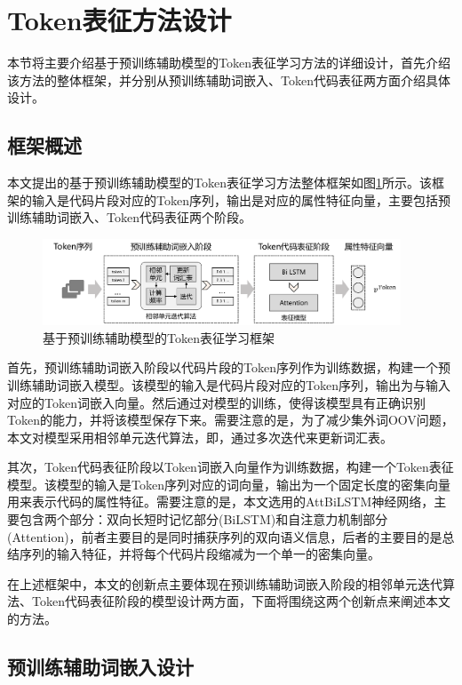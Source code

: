 \section{Token表征方法设计}
\label{sec:Token}
本节将主要介绍基于预训练辅助模型的Token表征学习方法的详细设计，首先介绍该方法的整体框架，并分别从预训练辅助词嵌入、Token代码表征两方面介绍具体设计。

\subsection{框架概述}
\label{subsec:TokenOverview}
本文提出的基于预训练辅助模型的Token表征学习方法整体框架如图\ref{fig:tokenframework}所示。该框架的输入是代码片段对应的Token序列，输出是对应的属性特征向量，主要包括预训练辅助词嵌入、Token代码表征两个阶段。

\begin{figure}[H]
  \centering
  \includegraphics[width=0.95\textwidth]{figures/tokenframework}
  \caption{基于预训练辅助模型的Token表征学习框架}\label{fig:tokenframework}
\end{figure}

首先，预训练辅助词嵌入阶段以代码片段的Token序列作为训练数据，构建一个预训练辅助词嵌入模型。该模型的输入是代码片段对应的Token序列，输出为与输入对应的Token词嵌入向量。然后通过对模型的训练，使得该模型具有正确识别Token的能力，并将该模型保存下来。需要注意的是，为了减少集外词OOV问题，本文对模型采用相邻单元迭代算法，即，通过多次迭代来更新词汇表。

其次，Token代码表征阶段以Token词嵌入向量作为训练数据，构建一个Token表征模型。该模型的输入是Token序列对应的词向量，输出为一个固定长度的密集向量用来表示代码的属性特征。需要注意的是，本文选用的AttBiLSTM神经网络，主要包含两个部分：双向长短时记忆部分(BiLSTM)和自注意力机制部分(Attention)，前者主要目的是同时捕获序列的双向语义信息，后者的主要目的是总结序列的输入特征，并将每个代码片段缩减为一个单一的密集向量。

在上述框架中，本文的创新点主要体现在预训练辅助词嵌入阶段的相邻单元迭代算法、Token代码表征阶段的模型设计两方面，下面将围绕这两个创新点来阐述本文的方法。

\subsection{预训练辅助词嵌入设计}
\label{subsec:TokenPreModel}

